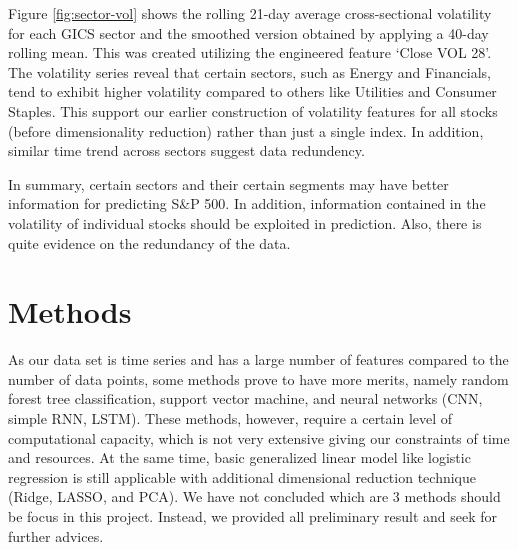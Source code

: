 \documentclass[11pt]{article}
\begin{document}
Figure \ref{fig:sector-vol} shows the rolling 21-day average cross-sectional volatility for each GICS sector and the smoothed version obtained by applying a 40-day rolling mean. This was created utilizing the engineered feature `Close VOL 28'. The volatility series reveal that certain sectors, such as Energy and Financials, tend to exhibit higher volatility compared to others like Utilities and Consumer Staples. This support our earlier construction of volatility features for all stocks (before dimensionality reduction) rather than just a single index. In addition, similar time trend across sectors suggest data redundency.

In summary, certain sectors and their certain segments may have better information for predicting S\&P 500. In addition, information contained in the volatility of individual stocks should be exploited in prediction. Also, there is quite evidence on the redundancy of the data. 

\section{Methods}

As our data set is time series and has a large number of features compared to the number of data points, some methods prove to have more merits, namely random forest tree classification, support vector machine, and neural networks (CNN, simple RNN, LSTM). These methods, however, require a certain level of computational capacity, which is not very extensive giving our constraints of time and resources. At the same time, basic generalized linear model like logistic regression is still applicable with additional dimensional reduction technique (Ridge, LASSO, and PCA). We have not concluded which are 3 methods should be focus in this project. Instead, we provided all preliminary result and seek for further advices. %
\end{document}

